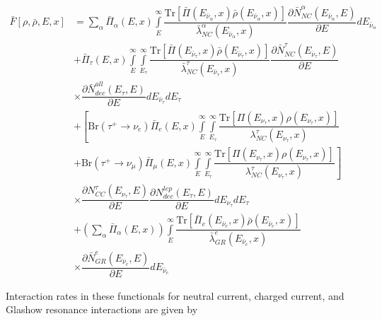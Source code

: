 \documentclass[main.tex]{subfiles}
\begin{document}
\begin{equation}\begin{split}
    \bar{F}\left[\rho,\bar{\rho}, E, x\right] &= \sum\limits_{\alpha}\bar{\Pi}_{\alpha}(E,x)\int\limits_{E}^{\infty}\dfrac{\text{Tr}\left[ \bar{\Pi}(E_{\bar{\nu}_{\alpha}}, x) \bar{\rho}(E_{\bar{\nu}_{\alpha}}, x) \right]}{\bar{\lambda}_{NC}^{\alpha}(E_{\bar{\nu}_{\alpha} }, x)}\dfrac{\partial\bar{N}_{NC}^{\alpha}(E_{\bar{\nu}_{\alpha}}, E)}{\partial E} d E_{\bar{\nu}_{\alpha}} \\ 
    &+ \bar{\Pi}_{\tau} (E,x) \int\limits_{E}^{\infty}\int\limits_{E_{\tau}}^{\infty}\dfrac{\text{Tr}\left[ \bar{\Pi}(E_{\bar{\nu}_{\tau}}, x) \bar{\rho}(E_{\bar{\nu}_{\tau}}, x) \right]}{\bar{\lambda}_{NC}^{\tau}(E_{\bar{\nu}_{\tau} }, x)}\dfrac{\partial\bar{N}_{NC}^{\tau}(E_{\bar{\nu}_{\tau}}, E)}{\partial E} \\
    &\times \dfrac{\partial\bar{N}_{dec}^{all}(E_{\tau}, E)}{\partial E} dE_{\bar{\nu}_{\tau}} dE_{\tau} \\
    &+ \left[ \text{Br}\left(\tau^{+} \to \nu_{e}\right)\bar{\Pi}_{e}(E,x)\int\limits_{E}^{\infty}\int\limits_{E_{\tau}}^{\infty} \dfrac{\text{Tr}\left[\Pi(E_{\nu_{\tau}}, x)\rho(E_{\nu_{\tau}}, x) \right] }{\lambda_{NC}^{\tau}(E_{\nu_{\tau}}, x)}  \right. \\
    &+ \left.\text{Br}\left(\tau^{+} \to \nu_{\mu}\right)\bar{\Pi}_{\mu}(E,x)\int\limits_{E}^{\infty}\int\limits_{E_{\tau}}^{\infty} \dfrac{\text{Tr}\left[\Pi(E_{\nu_{\tau}}, x)\rho(E_{\nu_{\tau}}, x) \right] }{\lambda_{NC}^{\tau}(E_{\nu_{\tau}}, x)}  \right] \\
    &\times \dfrac{\partial N_{CC}^{\tau}(E_{\nu_{\tau}}, E)}{\partial E} \dfrac{\partial N_{dec}^{lep}(E_{\tau}, E)}{\partial E} dE_{\nu_{\tau}} dE_{\tau} \\
    &+\left(\sum\limits_{\alpha} \bar{\Pi}_{\alpha} (E,x)\right) \int\limits_{E}^{\infty} \dfrac{\text{Tr}\left[\bar{\Pi}_{e}(E_{\bar{\nu}_{e}}, x) \bar{\rho}(E_{\bar{\nu}_{e}}, x) \right]}{\bar{\lambda}_{GR}^{e} (E_{\bar{\nu}_{e}}, x)}  \\
    &\times \dfrac{\partial\bar{N}_{GR}^{e}(E_{\bar{\nu}_{e}}, E)}{\partial E} dE_{\bar{\nu}_{e}}
\end{split}\end{equation}

Interaction rates in these functionals for neutral current, charged current, and Glashow resonance interactions are given by 
\end{document}
